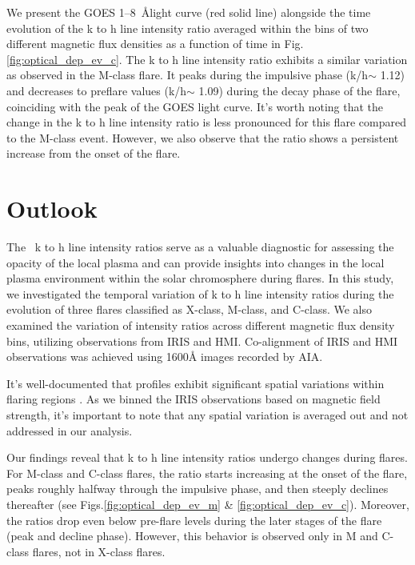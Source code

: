 We present the GOES 1{--}8~{\AA}light curve (red solid line) alongside the time evolution of the   k to h line intensity ratio averaged within the bins of two different magnetic flux densities as a function of time in Fig.\ref{fig:optical_dep_ev_c}. The   k to h line intensity ratio exhibits a similar variation as observed in the M-class flare. It peaks during the impulsive phase (k/h$\sim$ 1.12) and decreases to preflare values (k/h$\sim$ 1.09) during the decay phase of the flare, coinciding with the peak of the GOES light curve. It's worth noting that the change in the   k to h line intensity ratio is less pronounced for this flare compared to the M-class event. However, we also observe that the ratio shows a persistent increase from the onset of the flare.

\section{Outlook}

The  ~k to h line intensity ratios serve as a valuable diagnostic for assessing the opacity of the local plasma and can provide insights into changes in the local plasma environment within the solar chromosphere during flares. In this study, we investigated the temporal variation of  k to h line intensity ratios during the evolution of three flares classified as X-class, M-class, and C-class. We also examined the variation of intensity ratios across different magnetic flux density bins, utilizing observations from IRIS and HMI. Co-alignment of IRIS and HMI observations was achieved using 1600{\AA} images recorded by AIA.

It's well-documented that   profiles exhibit significant spatial variations within flaring regions \citep{dalda23,panos18}. As we binned the IRIS observations based on magnetic field strength, it's important to note that any spatial variation is averaged out and not addressed in our analysis.

Our findings reveal that   k to h line intensity ratios undergo changes during flares. For M-class and C-class flares, the ratio starts increasing at the onset of the flare, peaks roughly halfway through the impulsive phase, and then steeply declines thereafter (see Figs.\ref{fig:optical_dep_ev_m} \& \ref{fig:optical_dep_ev_c}). Moreover, the ratios drop even below pre-flare levels during the later stages of the flare (peak and decline phase). However, this behavior is observed only in M and C-class flares, not in X-class flares.

